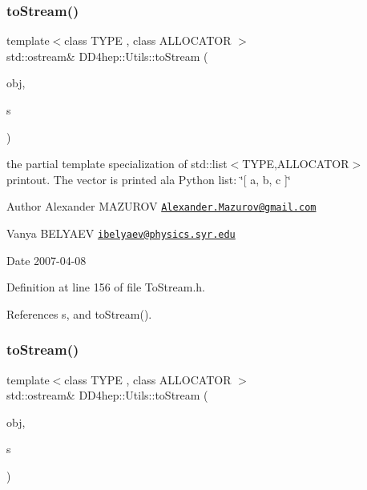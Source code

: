 \subsubsection{\texorpdfstring{to\+Stream()}{toStream()}\hspace{0.1cm}{\footnotesize\ttfamily [10/22]}}
{\footnotesize\ttfamily template$<$class T\+Y\+PE , class A\+L\+L\+O\+C\+A\+T\+OR $>$ \\
std\+::ostream\& D\+D4hep\+::\+Utils\+::to\+Stream (\begin{DoxyParamCaption}\item[{const std\+::list$<$ T\+Y\+PE, A\+L\+L\+O\+C\+A\+T\+OR $>$ \&}]{obj,  }\item[{std\+::ostream \&}]{s }\end{DoxyParamCaption})\hspace{0.3cm}{\ttfamily [inline]}}

the partial template specialization of {\ttfamily std\+::list$<$\+T\+Y\+P\+E,\+A\+L\+L\+O\+C\+A\+T\+O\+R$>$} printout. The vector is printed a\textquotesingle{}la Python list\+: \char`\"{}\mbox{[} a, b, c \mbox{]}\char`\"{} \begin{DoxyAuthor}{Author}
Alexander M\+A\+Z\+U\+R\+OV \href{mailto:Alexander.Mazurov@gmail.com}{\tt Alexander.\+Mazurov@gmail.\+com} 

Vanya B\+E\+L\+Y\+A\+EV \href{mailto:ibelyaev@physics.syr.edu}{\tt ibelyaev@physics.\+syr.\+edu} 
\end{DoxyAuthor}
\begin{DoxyDate}{Date}
2007-\/04-\/08 
\end{DoxyDate}


Definition at line 156 of file To\+Stream.\+h.



References s, and to\+Stream().

\hypertarget{namespace_d_d4hep_1_1_utils_aae9b1d676de789590541461e5187810d}{}\label{namespace_d_d4hep_1_1_utils_aae9b1d676de789590541461e5187810d} 
\subsubsection{\texorpdfstring{to\+Stream()}{toStream()}\hspace{0.1cm}{\footnotesize\ttfamily [11/22]}}
{\footnotesize\ttfamily template$<$class T\+Y\+PE , class A\+L\+L\+O\+C\+A\+T\+OR $>$ \\
std\+::ostream\& D\+D4hep\+::\+Utils\+::to\+Stream (\begin{DoxyParamCaption}\item[{const std\+::deque$<$ T\+Y\+PE, A\+L\+L\+O\+C\+A\+T\+OR $>$ \&}]{obj,  }\item[{std\+::ostream \&}]{s }\end{DoxyParamCaption})\hspace{0.3cm}{\ttfamily [inline]}}

